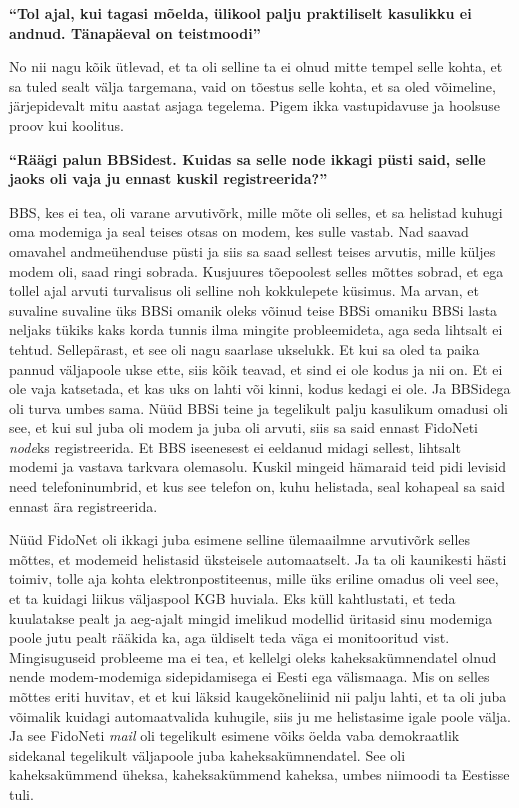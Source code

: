 \textbf{\enquote{Tol ajal, kui tagasi mõelda, ülikool palju praktiliselt 
kasulikku ei andnud. Tänapäeval on teistmoodi}}

No nii nagu kõik ütlevad, et  ta oli selline ta ei olnud mitte tempel selle 
kohta, et sa tuled sealt välja targemana, vaid on tõestus selle kohta, et sa 
oled võimeline, järjepidevalt mitu aastat asjaga tegelema. Pigem ikka 
vastupidavuse ja hoolsuse proov kui koolitus.

\textbf{\enquote{Räägi palun BBSidest. Kuidas sa selle node ikkagi püsti said, 
selle jaoks oli vaja ju ennast kuskil registreerida?}}

BBS, kes ei tea, oli varane  arvutivõrk, mille mõte oli selles, et sa helistad 
kuhugi oma modemiga ja seal teises otsas on modem, kes sulle vastab. Nad saavad 
omavahel andmeühenduse püsti ja siis sa saad sellest teises arvutis, mille 
küljes modem oli, saad ringi sobrada. Kusjuures tõepoolest selles mõttes 
sobrad, et ega tollel ajal arvuti turvalisus oli selline noh kokkulepete 
küsimus. Ma arvan, et suvaline suvaline üks BBSi omanik oleks võinud teise 
BBSi omaniku BBSi lasta neljaks tükiks kaks korda tunnis ilma mingite 
probleemideta, aga seda lihtsalt ei tehtud. Sellepärast, et see oli nagu 
saarlase ukselukk. Et kui sa oled ta paika pannud väljapoole ukse ette, siis kõik 
teavad, et sind ei ole kodus ja nii on. Et ei ole vaja katsetada, et kas uks 
on lahti või kinni, kodus kedagi ei ole. Ja BBSidega oli  turva umbes sama. 
Nüüd BBSi teine ja tegelikult palju kasulikum omadusi oli see, et kui sul juba 
oli modem ja juba oli arvuti, siis sa said ennast FidoNeti 
\emph{node}ks registreerida. Et BBS iseenesest ei eeldanud midagi sellest, lihtsalt 
modemi ja vastava tarkvara olemasolu. Kuskil mingeid hämaraid teid pidi levisid 
need telefoninumbrid, et kus see telefon on, kuhu helistada, seal kohapeal sa 
said ennast ära registreerida.

Nüüd FidoNet oli ikkagi juba esimene selline ülemaailmne arvutivõrk selles 
mõttes, et modemeid helistasid üksteisele automaatselt. Ja ta oli kaunikesti 
hästi toimiv,  tolle aja kohta elektronpostiteenus, mille üks  eriline omadus 
oli veel see, et ta kuidagi liikus väljaspool KGB huviala. Eks küll 
kahtlustati, et teda kuulatakse pealt ja aeg-ajalt mingid imelikud modellid 
üritasid sinu modemiga poole jutu pealt rääkida ka, aga üldiselt teda väga ei 
monitooritud vist. Mingisuguseid probleeme ma ei tea, et kellelgi oleks 
kaheksakümnendatel olnud nende modem-modemiga sidepidamisega ei Eesti ega 
välismaaga. Mis on selles mõttes eriti huvitav, et et kui läksid 
kaugekõneliinid nii palju lahti, et ta oli juba võimalik kuidagi automaatvalida 
kuhugile, siis ju me helistasime igale poole välja. Ja see 
FidoNeti \emph{mail} oli tegelikult  esimene võiks öelda vaba 
demokraatlik sidekanal tegelikult väljapoole juba kaheksakümnendatel. See oli 
kaheksakümmend üheksa, kaheksakümmend kaheksa, umbes niimoodi ta Eestisse tuli.

